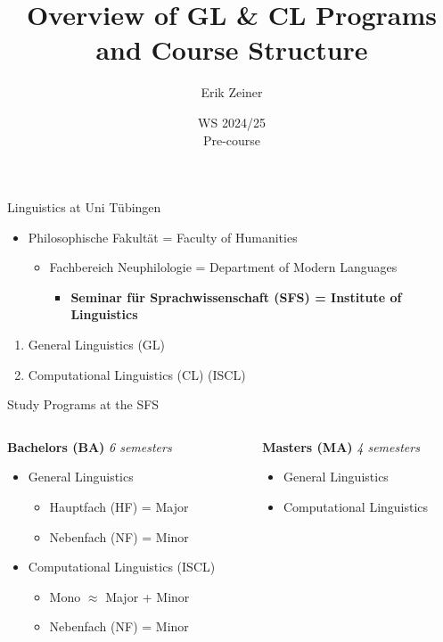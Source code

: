 \documentclass[aspectratio=169,hyperref={unicode},xcolor={dvipsnames}]{beamer}
\title{Overview of GL \& CL Programs and Course Structure}
\author{Erik Zeiner}
\institute{Fachschaft General \& Computational Linguistics\\ \textbf{University of Tübingen}}
\date{WS 2024/25 \\ Pre-course}
\begin{document}
\frame{\titlepage}
\begin{frame}{Linguistics at Uni Tübingen}
\begin{itemize}
	\item Philosophische Fakultät = Faculty of Humanities
		\begin{itemize}
			\item Fachbereich Neuphilologie = Department of Modern Languages
				\begin{itemize}
					\item \textbf{Seminar für Sprachwissenschaft (SFS) = Institute of Linguistics}
				\end{itemize}
		\end{itemize}
\end{itemize}
\begin{enumerate}
	\item General Linguistics (GL)
	\item Computational Linguistics (CL) (ISCL)
\end{enumerate}
\end{frame}

\begin{frame}{Study Programs at the SFS}
\begin{columns}[T]
	\begin{column}{0.5\linewidth}
   		\textbf{Bachelors (BA)} \textit{6 semesters}
		\begin{itemize}
			\item General Linguistics 
				\begin{itemize}
					\item Hauptfach (HF) = Major 
					\item Nebenfach (NF) = Minor
			\end{itemize}
			\item Computational Linguistics (ISCL)
				\begin{itemize}
					\item Mono $\approx$ Major + Minor
					\item Nebenfach (NF) = Minor
				\end{itemize}
		\end{itemize}
	\end{column}
	\begin{column}{0.5\linewidth}
	   		\textbf{Masters (MA)} \textit{4 semesters}
		\begin{itemize}
			\item General Linguistics 
			\item Computational Linguistics 
		\end{itemize}
	\end{column}
\end{columns}
\end{frame}
\end{document}
